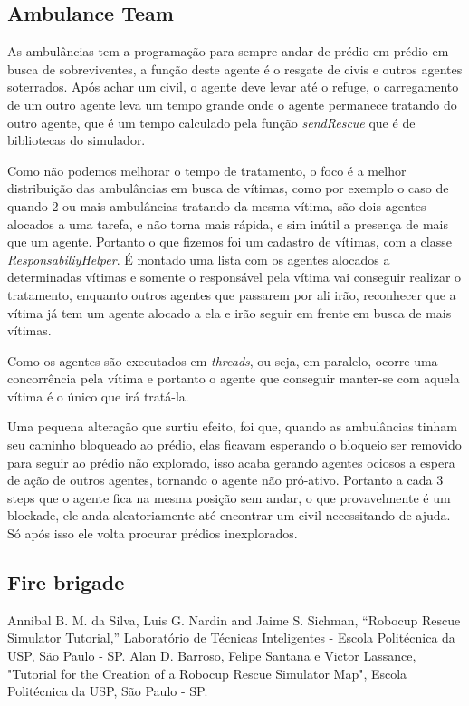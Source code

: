 \documentclass[conference]{IEEEtran}
\begin{document}
\subsection{Ambulance Team}
As ambulâncias tem a programação para sempre andar de prédio em prédio em busca de sobreviventes, a função deste agente é o resgate de civis e outros agentes soterrados. 
Após achar um civil, o agente deve levar até o refuge, o carregamento de um outro agente leva um tempo grande onde o agente permanece tratando do outro agente, que é um tempo calculado pela função \textit{sendRescue} que é de bibliotecas do simulador.

Como não podemos melhorar o tempo de tratamento, o foco é a melhor distribuição das ambulâncias em busca de vítimas, como por exemplo o caso de quando 2 ou mais ambulâncias tratando da mesma vítima, são dois agentes alocados a uma tarefa, e não torna mais rápida, e sim inútil a presença de mais que um agente. Portanto o que fizemos foi um cadastro de vítimas, com a classe \textit{ResponsabiliyHelper}. É montado uma lista com os agentes alocados a determinadas vítimas e somente o responsável pela vítima vai conseguir realizar o tratamento, enquanto outros agentes que passarem por ali irão, reconhecer que a vítima já tem um agente alocado a ela e irão seguir em frente em busca de mais vítimas.

Como os agentes são executados em \textit{threads}, ou seja, em paralelo, ocorre uma concorrência pela vítima e portanto o agente que conseguir manter-se com aquela vítima é o único que irá tratá-la.

Uma pequena alteração que surtiu efeito, foi que, quando as ambulâncias tinham seu caminho bloqueado ao prédio, elas ficavam esperando o bloqueio ser removido para seguir ao prédio não explorado, isso acaba gerando agentes ociosos a espera de ação de outros agentes, tornando o agente não pró-ativo. Portanto a cada 3 steps que o agente fica na mesma posição sem andar, o que provavelmente é um blockade, ele anda  aleatoriamente até encontrar um civil necessitando de ajuda. Só após isso ele volta procurar prédios inexplorados. 
\subsection{Fire brigade}

\begin{thebibliography}{00}
 Annibal B. M. da Silva, Luis G. Nardin and Jaime S. Sichman, ``Robocup Rescue Simulator Tutorial,'' Laboratório de Técnicas Inteligentes - Escola Politécnica da USP, São Paulo - SP.
 Alan D. Barroso, Felipe Santana e Victor Lassance, "Tutorial for the Creation of a Robocup Rescue Simulator Map", Escola Politécnica da USP, São Paulo - SP.

\end{thebibliography}
\end{document}
